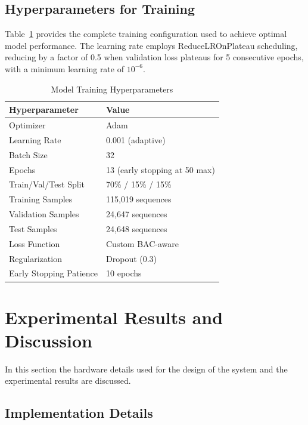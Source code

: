 \documentclass[HARVARD,Times2COL]{WileyNJDv5}
\begin{document}
\subsection{Hyperparameters for Training}
Table~\ref{tab:training} provides the complete training configuration used to achieve optimal model performance. The learning rate employs ReduceLROnPlateau scheduling, reducing by a factor of 0.5 when validation loss plateaus for 5 consecutive epochs, with a minimum learning rate of $10^{-6}$.

\begin{table}[htbp]
\caption{Model Training Hyperparameters}
\label{tab:training}
\centering
\small
\begin{tabular}{@{}ll@{}}
\toprule
\textbf{Hyperparameter} & \textbf{Value} \\
\midrule
Optimizer & Adam \\
Learning Rate & 0.001 (adaptive) \\
Batch Size & 32 \\
Epochs & 13 (early stopping at 50 max) \\
Train/Val/Test Split & 70\% / 15\% / 15\% \\
Training Samples & 115,019 sequences \\
Validation Samples & 24,647 sequences \\
Test Samples & 24,648 sequences \\
Loss Function & Custom BAC-aware \\
Regularization & Dropout (0.3) \\
Early Stopping Patience & 10 epochs \\
\bottomrule
\end{tabular}
\end{table}


\section{Experimental Results and Discussion}
In this section the hardware details used for the design of the system and the experimental results are discussed.

\subsection{Implementation Details}
\end{document}
